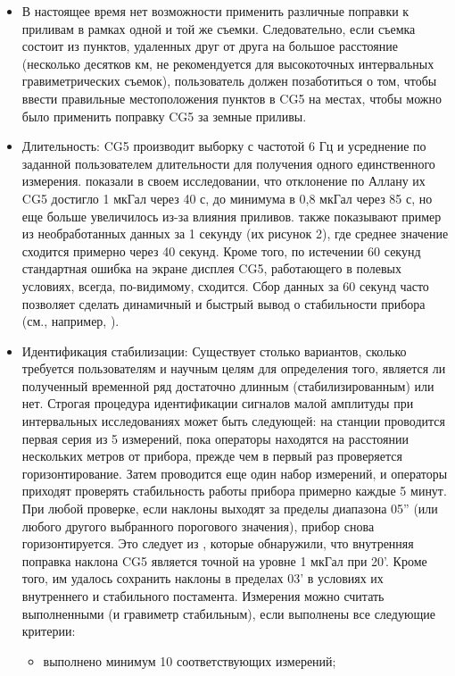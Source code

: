 \begin{itemize}
    \item В настоящее время нет возможности применить различные поправки к
    приливам в рамках одной и той же съемки. Следовательно, если съемка состоит
    из пунктов, удаленных друг от друга на большое расстояние (несколько
    десятков км, не рекомендуется для высокоточных интервальных гравиметрических 
    съемок), пользователь должен позаботиться о том, чтобы ввести правильные
    местоположения пунктов в CG5 на местах, чтобы можно было применить поправку
    CG5 за земные приливы.
    
    \item Длительность: CG5 производит выборку с частотой 6 Гц и усреднение по
    заданной пользователем длительности для получения одного единственного
    измерения. \cite{merlet_micro-gravity_2008} показали в своем исследовании, что
    отклонение по Аллану их CG5 достигло 1 мкГал через 40 с, до минимума в 0,8
    мкГал через 85 с, но еще больше увеличилось из-за влияния приливов.
    \cite{gettings_techniques_2008} также показывают пример из необработанных
    данных за 1 секунду (их рисунок 2), где среднее значение сходится примерно
    через 40 секунд.  Кроме того, по истечении 60 секунд стандартная ошибка на
    экране дисплея CG5, работающего в полевых условиях, всегда, по-видимому,
    сходится. Сбор данных за 60 секунд часто позволяет сделать динамичный и
    быстрый вывод о стабильности прибора (см., например, \cite{hector_water_2015}).

    \item Идентификация стабилизации: Существует столько вариантов, сколько
    требуется пользователям и научным целям для определения того, является ли
    полученный временной ряд достаточно длинным (стабилизированным) или нет.
    Строгая процедура идентификации сигналов малой амплитуды при интервальных 
    исследованиях может быть следующей: на станции проводится первая серия из 5
    измерений, пока операторы находятся на расстоянии нескольких метров от
    прибора, прежде чем в первый раз проверяется горизонтирование. Затем
    проводится еще один набор измерений, и операторы приходят проверять
    стабильность работы прибора примерно каждые 5 минут. При любой проверке,
    если наклоны выходят за пределы диапазона 0\textpm{}5'' (или любого другого
    выбранного порогового значения), прибор снова горизонтируется. Это следует
    из \cite{merlet_micro-gravity_2008}, которые обнаружили, что внутренняя
    поправка наклона CG5 является точной на уровне 1 мкГал при \textpm{}20'.
    Кроме того, им удалось сохранить наклоны в пределах 0\textpm{}3' в условиях их
    внутреннего и стабильного постамента. Измерения можно считать выполненными (и
    гравиметр стабильным), если выполнены все следующие критерии:
    \begin{itemize}
        \item выполнено минимум 10 соответствующих измерений;
        

\end{itemize}
\end{itemize}
